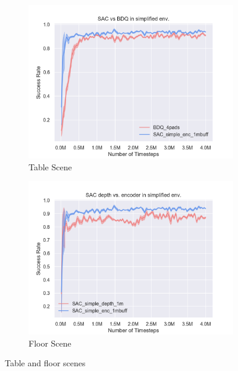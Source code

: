 \begin{figure}[!htbp]
    \begin{subfigure}{0.49\textwidth}
        \includegraphics[width=\linewidth]{figures/SAC_vs_BDQ_in_simplified_env}
        \caption{Table Scene} \label{fig:table}
    \end{subfigure}%
    \hspace*{\fill}   %
    \begin{subfigure}{0.49\textwidth}
        \includegraphics[width=\linewidth]{figures/SAC_depth_vs_encoder_in_simplified_env}
        \caption{Floor Scene} \label{fig:floor}
    \end{subfigure}%
    \hspace*{\fill}   %


\caption{ Table and floor scenes \label{fig:scenes}}
\end{figure}

